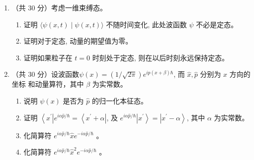 
\begin{enumerate}
	\item
	（共 30 分）考虑一维束缚态。
	\begin{enumerate}
		\item
		证明 $\langle\psi(x, t) \mid \psi(x, t)\rangle$ 不随时间变化, 此处波函数 $\psi$ 不必是定态。
		\item 
		证明对于定态, 动量的期望值为零。
		\item 
		证明如果粒子在 $t=0$ 时刻处于定态, 则在以后时刻永远保持定态。

	\end{enumerate}
\banswer{
	
}
	
\item 
（共 30 分）设波函数$\psi(x)=(1 / \sqrt{2 \pi}) e^{i p(x+\beta) \hbar}$, 而 $\hat{x}, \hat{p}$ 分别为 $x$ 方向的坐标
和动量算符，其中 $\beta$ 为实常数。
\begin{enumerate}
	\item
说明 $\psi(x)$ 是否为 $\hat{p}$ 的归一化本征态。
\item 
证明 $\left\langle x^{\prime}\right| e^{i \alpha \hat{p} / \hbar}=\left\langle x^{\prime}+\alpha\right|$, 及 $e^{i \alpha \hat{p} / \hbar}\left|x^{\prime}\right\rangle=\left|x^{\prime}-\alpha\right\rangle$, 其中 $\alpha$ 为实常数。
\item 
化简算符 $e^{i \alpha \hat{p} / \hbar} \hat{x} e^{-i \alpha \hat{p} / \hbar}$ 。
\item 
化简算符 $e^{i \alpha \hat{p} / \hbar} \hat{x}^{2} e^{-i \alpha \hat{p} / \hbar}$ 。

\end{enumerate}


\end{enumerate}
